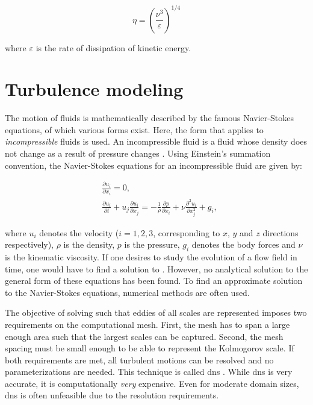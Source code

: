 \begin{equation}
    \eta = \left( \frac{\nu^3}{\varepsilon} \right)^{1/4}
    \label{eq:kolmogorov-length}
\end{equation}

where $\varepsilon$ is the rate of dissipation of kinetic energy.

\section{Turbulence modeling}
The motion of fluids is mathematically described by the famous Navier-Stokes equations, of which various forms exist. Here, the form that applies to \emph{incompressible} fluids is used. An incompressible fluid is a fluid whose density does not change as a result of pressure changes \citep{popeTurbulentFlows2000}. Using Einstein's summation convention, the Navier-Stokes equations for an incompressible fluid are given by:

\begin{align}
    &\frac{\partial u_i}{\partial x_i} = 0, \label{eq:ns_mass_conservation}\\
    &\frac{\partial u_i}{\partial t} + u_j \frac{\partial u_i}{\partial x_j} = - \frac{1}{\rho} \frac{\partial p}{\partial x_i} + \nu \frac{\partial^2 u_i}{\partial x_j^2}+ g_i,
    \label{eq:ns_momentum}
\end{align}

where $u_i$ denotes the velocity ($i=1,2,3$, corresponding to $x$, $y$ and $z$ directions respectively), $\rho$ is the density, $p$ is the pressure, $g_i$ denotes the body forces and $\nu$ is the kinematic viscosity. If one desires to study the evolution of a flow field in time, one would have to find a solution to . However, no analytical solution to the general form of these equations has been found. To find an approximate solution to the Navier-Stokes equations, numerical methods are often used. 

The objective of solving  such that eddies of all scales are represented imposes two requirements on the computational mesh. First, the mesh has to span a large enough area such that the largest scales can be captured. Second, the mesh spacing must be small enough to be able to represent the Kolmogorov scale. If both requirements are met, all turbulent motions can be resolved and no parameterizations are needed. This technique is called \acrfull{dns} \citep{popeTurbulentFlows2000}. While \acrshort{dns} is very accurate, it is computationally \emph{very} expensive. Even for moderate domain sizes, \acrshort{dns} is often unfeasible due to the resolution requirements.

